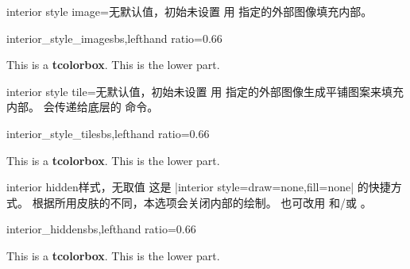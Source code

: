 \clearpage
\begin{docTcbKey}{interior style image}{=}{无默认值，初始未设置}
  用  指定的外部图像填充内部。
\begin{exdispExample*}{interior_style_image}{sbs,lefthand ratio=0.66}

\begin{tcolorbox}[enhanced,title=My title,
  interior style image=goldshade.png]
This is a \textbf{tcolorbox}.
\tcblower
This is the lower part.
\end{tcolorbox}
\end{exdispExample*}
\end{docTcbKey}


\begin{docTcbKey}{interior style tile}{=}{无默认值，初始未设置}
  用  指定的外部图像生成平铺图案来填充内部。
  会传递给底层的  命令。
\begin{exdispExample*}{interior_style_tile}{sbs,lefthand ratio=0.66}

\begin{tcolorbox}[enhanced,title=My title,
  interior style tile={width=2cm}{crinklepaper.png}]
This is a \textbf{tcolorbox}.
\tcblower
This is the lower part.
\end{tcolorbox}
\end{exdispExample*}
\end{docTcbKey}


\begin{docTcbKey}{interior hidden}{}{样式，无取值}
  这是 |interior style={draw=none,fill=none}| 的快捷方式。
  根据所用皮肤的不同，本选项会关闭内部的绘制。
  也可改用  和/或 。
\begin{exdispExample*}{interior_hidden}{sbs,lefthand ratio=0.66}

\begin{tcolorbox}[enhanced,title=My title,
  interior hidden]
This is a \textbf{tcolorbox}.
\tcblower
This is the lower part.
\end{tcolorbox}
\end{exdispExample*}
\end{docTcbKey}

